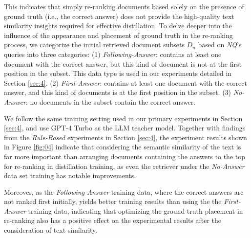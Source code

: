 This indicates that simply re-ranking documents based solely on the presence of ground truth (i.e., the correct answer) does not provide the high-quality text similarity insights required for effective distillation.
To delve deeper into the influence of the appearance and placement of ground truth in the re-ranking process, we categorize the initial retrieved document subsets $D_n$ based on \textit{NQ}'s queries into three categories:
(1) \textit{Following-Answer}: contains at least one document with the correct answer, but this kind of document is not at the first position in the subset. 
This data type is used in our experiments detailed in Section \ref{sec:4}.
(2) \textit{First-Answer}: contains at least one document with the correct answer, and this kind of documents is at the first position in the subset.
(3) \textit{No-Answer}: no documents in the subset contain the correct answer.

We follow the same training setting used in our primary experiments in Section \ref{sec:4}, and use GPT-4 Turbo as the LLM teacher model.
Together with findings from the \textit{Rule-Based} experiments in Section \ref{sec:4}, the experiment results shown in Figure \ref{fig:04} indicate that considering the semantic similarity of the text is far more important than arranging documents containing the answers to the top for re-ranking in distillation training, as even the retriever under the \textit{No-Answer} data set training has notable improvements.

Moreover, as the \textit{Following-Answer} training data, where the correct answers are not ranked first initially, yields better training results than using the the \textit{First-Answer} training data, indicating that optimizing the ground truth placement in re-ranking also has a positive effect on the experimental results after the consideration of text similarity.

